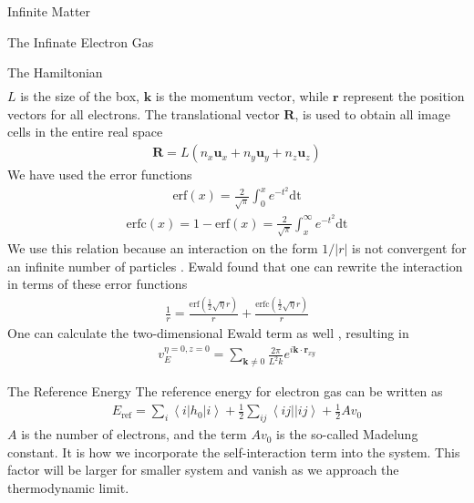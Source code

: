 \documentclass[twoside,english]{uiofysmaster}
\begin{document}
\begin{chapter}{Infinite Matter}
\begin{section}{The Infinate Electron Gas}
\begin{subsection}{The Hamiltonian}
\begin{align}
			\end{align}
			$L$ is the size of the box, $\mathbf{k}$ is the momentum vector, while $\mathbf{r}$ represent the position vectors for all electrons. The translational vector $\mathbf{R}$, is used to obtain all image cells in the entire real space \cite{MHJonline}
			\begin{align}
				\mathbf{R} = L(n_x \mathbf{u}_x + n_y \mathbf{u}_y + n_z \mathbf{u}_z)
			\end{align}
			We have used the error functions
			\begin{align}
				\text{erf}(x) = \frac{2}{\sqrt{\pi}} \int_0^x e^{-t^2} \text{dt}
			\end{align}
			\begin{align}
				\text{erfc}(x) = 1 - \text{erf}(x) = \frac{2}{\sqrt{\pi}} \int_x^\infty e^{-t^2} \text{dt}
			\end{align}
			We use this relation because an interaction on the form $1/|r|$ is not convergent for an infinite number of particles \cite{Audun}. Ewald found that one can rewrite the interaction in terms of these error functions \cite{Ewald}
			\begin{align}
				\frac{1}{r} = \frac{\text{erf}(\frac{1}{2}\sqrt{\eta}r)}{r} + \frac{\text{erfc}(\frac{1}{2}\sqrt{\eta}r)}{r}
			\end{align}
			One can calculate the two-dimensional Ewald term as well \cite{Baardsen}, resulting in 
			\begin{align}
				v_E^{\eta=0, z=0} = \sum_{\mathbf{k} \neq 0} \frac{2 \pi}{L^2 k} e^{i \mathbf{k} \cdot \mathbf{r}_{xy}}
			\end{align}
		\end{subsection}
		
		\begin{subsection}{The Reference Energy}
			The reference energy for electron gas can be written as \cite{Baardsen}
			\begin{align}
				E_{\text{ref}} = \sum_i \left<i | h_0 | i\right> + \frac{1}{2} \sum_{ij} \left<ij||ij\right> + \frac{1}{2} Av_0
			\end{align}
			$A$ is the number of electrons, and the term $A v_0$ is the so-called Madelung constant. It is how we incorporate the self-interaction term into the system. This factor will be larger for smaller system and vanish as we approach the thermodynamic limit. 
		\end{subsection}
		

\end{section}
\end{chapter}
\end{document}
